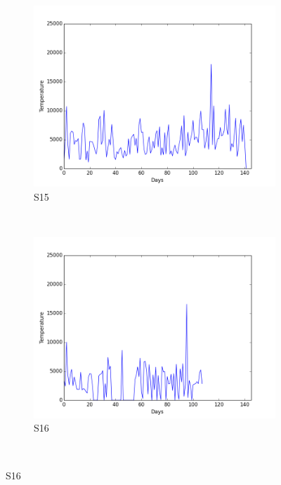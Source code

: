 \documentclass[12pt]{article} %
\begin{document}
\begin{figure}[H]
    \begin{subfigure}[b]{0.30\textwidth}
        \includegraphics[width=\textwidth]{img/graphs/15-steps-1}
        \caption{S15}
        \label{fig:s15Steps}
    \end{subfigure}
    ~ %
    \begin{subfigure}[b]{0.30\textwidth}
        \includegraphics[width=\textwidth]{img/graphs/16-steps-1}
        \caption{S16}
        \label{fig:s16Steps}
    \end{subfigure}
    ~ %

\end{figure}
\end{document}
